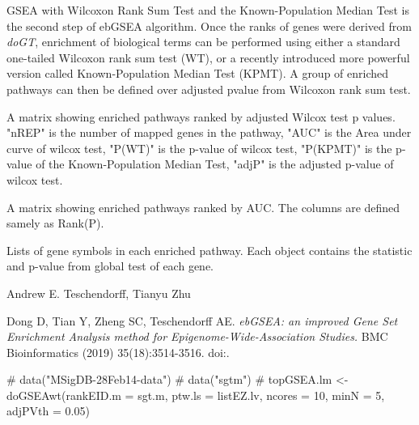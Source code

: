 \documentclass[letterpaper]{book}
\begin{document}
%
\begin{Details}\relax
GSEA with Wilcoxon Rank Sum Test and the Known-Population Median Test is the second step of ebGSEA algorithm. Once the ranks of genes were derived from \emph{doGT}, enrichment of biological terms can be performed using either a standard one-tailed Wilcoxon rank sum test (WT), or a recently introduced more powerful version called Known-Population Median Test (KPMT). A group of enriched pathways can then be defined over adjusted pvalue from Wilcoxon rank sum test.
\end{Details}
%
\begin{Value}
\begin{ldescription}
\item[\code{Rank(P)}] A matrix showing enriched pathways ranked by adjusted Wilcox test p values.
"nREP" is the number of mapped genes in the pathway,
"AUC" is the Area under curve of wilcox test,
"P(WT)" is the p-value of wilcox test,
"P(KPMT)" is the p-value of the Known-Population Median Test,
"adjP" is the adjusted p-value of wilcox test.

\item[\code{Rank(AUC)}] A matrix showing enriched pathways ranked by AUC. The columns are defined samely as Rank(P).

\item[\code{Genestat}] Lists of gene symbols in each enriched pathway. Each object contains the statistic and p-value from global test of each gene.
\end{ldescription}
\end{Value}
%
\begin{Author}\relax
Andrew E. Teschendorff, Tianyu Zhu
\end{Author}
%
\begin{References}\relax
Dong D, Tian Y, Zheng SC, Teschendorff AE.
\emph{ebGSEA: an improved Gene Set Enrichment Analysis method for Epigenome-Wide-Association Studies.}
BMC Bioinformatics (2019) 35(18):3514-3516.
doi:.
\end{References}
%
\begin{Examples}
\begin{ExampleCode}
# data("MSigDB-28Feb14-data")
# data("sgtm")
# topGSEA.lm <- doGSEAwt(rankEID.m = sgt.m, ptw.ls = listEZ.lv, ncores = 10, minN = 5, adjPVth = 0.05)

\end{ExampleCode}
\end{Examples}
\end{document}
